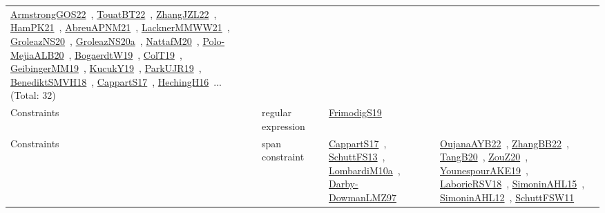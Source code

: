 {\begin{longtable}{lp{3cm}>{\raggedright\arraybackslash}p{6cm}>{\raggedright\arraybackslash}p{6cm}>{\raggedright\arraybackslash}p{8cm}}
\href{works/ArmstrongGOS22.pdf}{ArmstrongGOS22}~\cite{ArmstrongGOS22}, \href{works/TouatBT22.pdf}{TouatBT22}~\cite{TouatBT22}, \href{works/ZhangJZL22.pdf}{ZhangJZL22}~\cite{ZhangJZL22}, \href{works/HamPK21.pdf}{HamPK21}~\cite{HamPK21}, \href{works/AbreuAPNM21.pdf}{AbreuAPNM21}~\cite{AbreuAPNM21}, \href{works/LacknerMMWW21.pdf}{LacknerMMWW21}~\cite{LacknerMMWW21}, \href{works/GroleazNS20.pdf}{GroleazNS20}~\cite{GroleazNS20}, \href{works/GroleazNS20a.pdf}{GroleazNS20a}~\cite{GroleazNS20a}, \href{works/NattafM20.pdf}{NattafM20}~\cite{NattafM20}, \href{works/Polo-MejiaALB20.pdf}{Polo-MejiaALB20}~\cite{Polo-MejiaALB20}, \href{works/BogaerdtW19.pdf}{BogaerdtW19}~\cite{BogaerdtW19}, \href{works/ColT19.pdf}{ColT19}~\cite{ColT19}, \href{works/GeibingerMM19.pdf}{GeibingerMM19}~\cite{GeibingerMM19}, \href{works/KucukY19.pdf}{KucukY19}~\cite{KucukY19}, \href{works/ParkUJR19.pdf}{ParkUJR19}~\cite{ParkUJR19}, \href{works/BenediktSMVH18.pdf}{BenediktSMVH18}~\cite{BenediktSMVH18}, \href{works/CappartS17.pdf}{CappartS17}~\cite{CappartS17}, \href{works/HechingH16.pdf}{HechingH16}~\cite{HechingH16}... (Total: 32)\\
Constraints & regular expression &  & \href{works/FrimodigS19.pdf}{FrimodigS19}~\cite{FrimodigS19} & \\
Constraints & span constraint &  & \href{works/CappartS17.pdf}{CappartS17}~\cite{CappartS17}, \href{works/SchuttFS13.pdf}{SchuttFS13}~\cite{SchuttFS13}, \href{works/LombardiM10a.pdf}{LombardiM10a}~\cite{LombardiM10a}, \href{works/Darby-DowmanLMZ97.pdf}{Darby-DowmanLMZ97}~\cite{Darby-DowmanLMZ97} & \href{works/OujanaAYB22.pdf}{OujanaAYB22}~\cite{OujanaAYB22}, \href{works/ZhangBB22.pdf}{ZhangBB22}~\cite{ZhangBB22}, \href{works/TangB20.pdf}{TangB20}~\cite{TangB20}, \href{works/ZouZ20.pdf}{ZouZ20}~\cite{ZouZ20}, \href{works/YounespourAKE19.pdf}{YounespourAKE19}~\cite{YounespourAKE19}, \href{works/LaborieRSV18.pdf}{LaborieRSV18}~\cite{LaborieRSV18}, \href{works/SimoninAHL15.pdf}{SimoninAHL15}~\cite{SimoninAHL15}, \href{works/SimoninAHL12.pdf}{SimoninAHL12}~\cite{SimoninAHL12}, \href{works/SchuttFSW11.pdf}{SchuttFSW11}~\cite{SchuttFSW11}\\

\end{longtable}}
